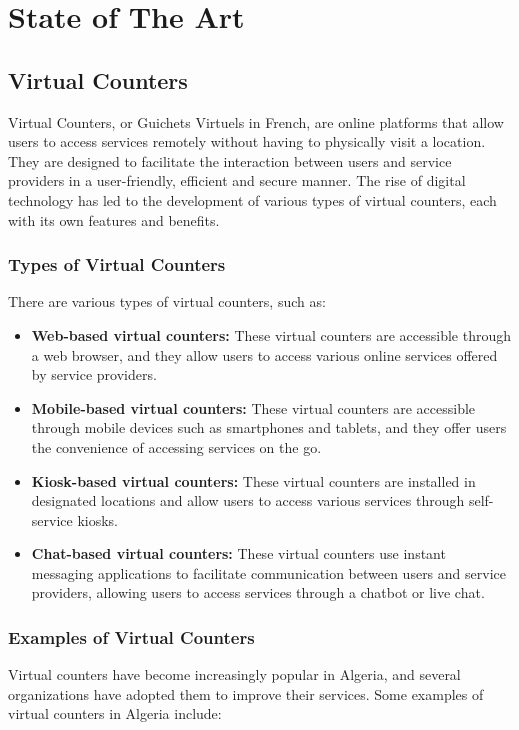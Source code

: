 \chapter{State of The Art}
\section{Virtual Counters}
Virtual Counters, or Guichets Virtuels in French, are online platforms that allow users to access services remotely without having to physically visit a location. They are designed to facilitate the interaction between users and service providers in a user-friendly, efficient and secure manner. The rise of digital technology has led to the development of various types of virtual counters, each with its own features and benefits.

\subsection{Types of Virtual Counters}
There are various types of virtual counters, such as:
\begin{itemize}
    \item \textbf{Web-based virtual counters:} These virtual counters are accessible through a web browser, and they allow users to access various online services offered by service providers.
    \item \textbf{Mobile-based virtual counters:} These virtual counters are accessible through mobile devices such as smartphones and tablets, and they offer users the convenience of accessing services on the go.
    \item \textbf{Kiosk-based virtual counters:} These virtual counters are installed in designated locations and allow users to access various services through self-service kiosks.
    \item \textbf{Chat-based virtual counters:} These virtual counters use instant messaging applications to facilitate communication between users and service providers, allowing users to access services through a chatbot or live chat.
\end{itemize}

\subsection{Examples of Virtual Counters}
Virtual counters have become increasingly popular in Algeria, and several organizations have adopted them to improve their services. Some examples of virtual counters in Algeria include:


